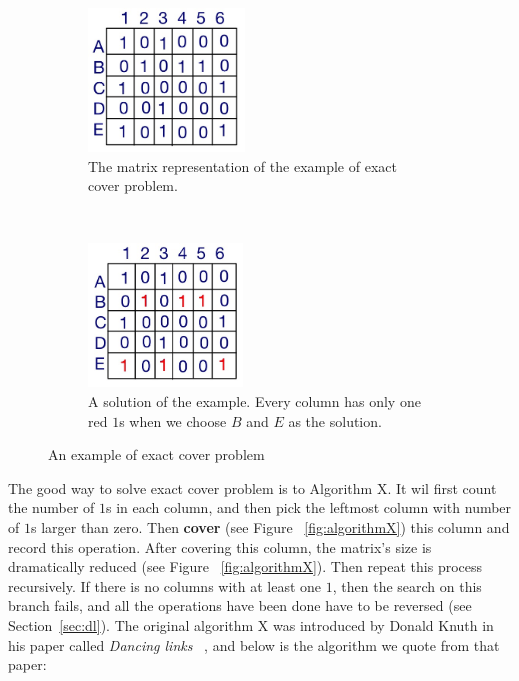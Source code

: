 \begin{figure}[ht]
  \centering
  \begin{subfigure}[t]{0.5\textwidth}
    \includegraphics[height=1.5in]{figure/ecp_1.JPG}
    \caption{The matrix representation of the example of exact cover problem.}
    \label{fig:ecp_1}
  \end{subfigure}%
  ~  
  \begin{subfigure}[t]{0.5\textwidth}
    \includegraphics[height=1.5in]{figure/ecp_2.JPG}
    \caption{A solution of the example. Every column has only one red $1$s when we choose $B$ and $E$ as the solution. }
    \label{fig:ecp_2}
  \end{subfigure}%
  \caption{An example of exact cover problem}
  \label{fig:ecp}
\end{figure}

The good way to solve exact cover problem  is to Algorithm X. It wil first count the number of $1$s in each column, and then pick the leftmost column with number of $1$s larger than zero. Then \textbf{cover} (see Figure ~\ref{fig:algorithmX}) this column and record this operation. After covering this column, the matrix's size is dramatically reduced (see Figure ~\ref{fig:algorithmX}). Then repeat this process recursively. If there is no columns with at least one $1$, then the search on this branch fails, and all the operations have been done have to be reversed (see Section~\ref{sec:dl}). The original algorithm X was introduced by Donald Knuth in his paper called \textit{Dancing links} ~\cite{knuth_dancing_2000}, and below is the algorithm we quote from that paper:

